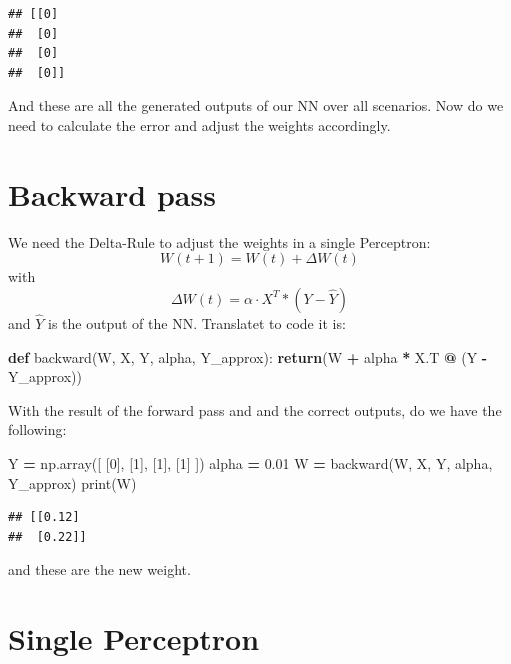 \documentclass[
]{book}
\newenvironment{Shaded}{\begin{snugshade}}{\end{snugshade}}
\newcommand{\BuiltInTok}[1]{#1}
\newcommand{\ControlFlowTok}[1]{\textcolor[rgb]{0.13,0.29,0.53}{\textbf{#1}}}
\newcommand{\DecValTok}[1]{\textcolor[rgb]{0.00,0.00,0.81}{#1}}
\newcommand{\FloatTok}[1]{\textcolor[rgb]{0.00,0.00,0.81}{#1}}
\newcommand{\KeywordTok}[1]{\textcolor[rgb]{0.13,0.29,0.53}{\textbf{#1}}}
\newcommand{\NormalTok}[1]{#1}
\newcommand{\OperatorTok}[1]{\textcolor[rgb]{0.81,0.36,0.00}{\textbf{#1}}}
\begin{document}
\begin{verbatim}
## [[0]
##  [0]
##  [0]
##  [0]]
\end{verbatim}

And these are all the generated outputs of our NN over all scenarios. Now do we need to calculate the error and adjust the weights accordingly.

\hypertarget{backward-pass}{%
\section{Backward pass}\label{backward-pass}}

We need the Delta-Rule to adjust the weights in a single Perceptron:
\[
  W(t+1) = W(t) + \Delta W(t)
\]
with
\[
  \Delta W(t) = \alpha \cdot X^{T} * (Y - \hat{Y})
\]
and \(\hat{Y}\) is the output of the NN. Translatet to code it is:

\begin{Shaded}
\begin{Highlighting}[]
\KeywordTok{def}\NormalTok{ backward(W, X, Y, alpha, Y\_approx):}
    \ControlFlowTok{return}\NormalTok{(W }\OperatorTok{+}\NormalTok{ alpha }\OperatorTok{*}\NormalTok{ X.T }\OperatorTok{@}\NormalTok{ (Y }\OperatorTok{{-}}\NormalTok{ Y\_approx))}
\end{Highlighting}
\end{Shaded}

With the result of the forward pass and and the correct outputs, do we have the following:

\begin{Shaded}
\begin{Highlighting}[]
\NormalTok{Y }\OperatorTok{=}\NormalTok{ np.array([}
\NormalTok{  [}\DecValTok{0}\NormalTok{],}
\NormalTok{  [}\DecValTok{1}\NormalTok{],}
\NormalTok{  [}\DecValTok{1}\NormalTok{],}
\NormalTok{  [}\DecValTok{1}\NormalTok{]}
\NormalTok{])}
\NormalTok{alpha }\OperatorTok{=} \FloatTok{0.01}
\NormalTok{W }\OperatorTok{=}\NormalTok{ backward(W, X, Y, alpha, Y\_approx)}
\BuiltInTok{print}\NormalTok{(W)}
\end{Highlighting}
\end{Shaded}

\begin{verbatim}
## [[0.12]
##  [0.22]]
\end{verbatim}

and these are the new weight.

\hypertarget{single-perceptron-1}{%
\section{Single Perceptron}\label{single-perceptron-1}}
\end{document}
